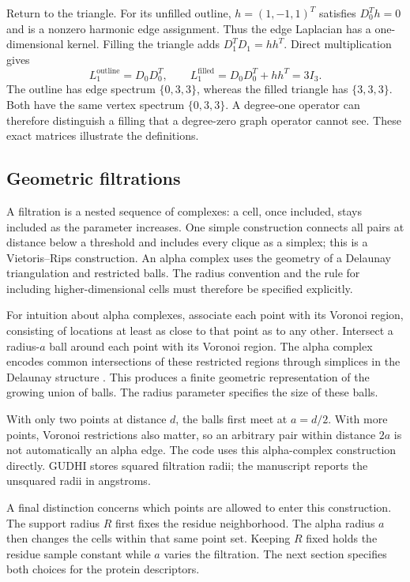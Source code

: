 Return to the triangle. For its unfilled outline, $h=(1,-1,1)^T$ satisfies $D_0^Th=0$ and is a nonzero harmonic edge assignment. Thus the edge Laplacian has a one-dimensional kernel. Filling the triangle adds $D_1^TD_1=hh^T$. Direct multiplication gives
\begin{equation}
L_1^{\mathrm{outline}}=D_0D_0^T,
\qquad L_1^{\mathrm{filled}}=D_0D_0^T+hh^T=3I_3.
\end{equation}
The outline has edge spectrum $\{0,3,3\}$, whereas the filled triangle has $\{3,3,3\}$. Both have the same vertex spectrum $\{0,3,3\}$. A degree-one operator can therefore distinguish a filling that a degree-zero graph operator cannot see. These exact matrices illustrate the definitions.

\subsection{Geometric filtrations}
A filtration is a nested sequence of complexes: a cell, once included, stays included as the parameter increases. One simple construction connects all pairs at distance below a threshold and includes every clique as a simplex; this is a Vietoris--Rips construction. An alpha complex uses the geometry of a Delaunay triangulation and restricted balls. The radius convention and the rule for including higher-dimensional cells must therefore be specified explicitly.

For intuition about alpha complexes, associate each point with its Voronoi region, consisting of locations at least as close to that point as to any other. Intersect a radius-$a$ ball around each point with its Voronoi region. The alpha complex encodes common intersections of these restricted regions through simplices in the Delaunay structure \citep{edelsbrunner1994,gudhi}. This produces a finite geometric representation of the growing union of balls. The radius parameter specifies the size of these balls.

With only two points at distance $d$, the balls first meet at $a=d/2$. With more points, Voronoi restrictions also matter, so an arbitrary pair within distance $2a$ is not automatically an alpha edge. The code uses this alpha-complex construction directly. GUDHI stores squared filtration radii; the manuscript reports the unsquared radii in angstroms.

A final distinction concerns which points are allowed to enter this construction. The support radius $R$ first fixes the residue neighborhood. The alpha radius $a$ then changes the cells within that same point set. Keeping $R$ fixed holds the residue sample constant while $a$ varies the filtration. The next section specifies both choices for the protein descriptors.
